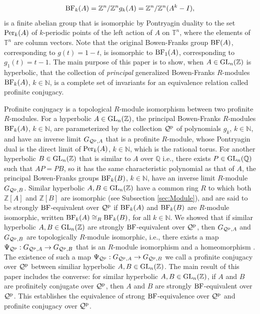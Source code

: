 \documentclass{amsart}
\theoremstyle{plain}
\theoremstyle{definition}
\theoremstyle{remark}
\begin{document}
\[ {\rm BF}_k(A) = {\mathbb Z}^n/{\mathbb Z}^n g_k(A) = {\mathbb Z}^n/{\mathbb Z}^n(A^k-I),\]
is a finite abelian group that is isomorphic by Pontryagin duality to the set ${\rm Per}_k(A)$ of $k$-periodic points of the left action of $A$ on ${\mathbb T}^n$, where the elements of ${\mathbb T}^n$ are column vectors. Note that the original Bowen-Franks group ${\rm BF}(A)$, corresponding to $g(t) = 1-t$, is isomorphic to ${\rm BF}_1(A)$, corresponding to $g_1(t) = t-1$. The main purpose of this paper is to show, when $A\in {\rm GL}_n({\mathbb Z})$ is hyperbolic, that the collection of {\it principal} generalized Bowen-Franks $R$-modules ${\rm BF}_k(A)$, $k \in {\mathbb N}$, is a complete set of invariants for an equivalence relation called profinite conjugacy.

Profinite conjugacy is a topological $R$-module isomorphism between two profinite $R$-modules. For a hyperbolic $A\in {\rm GL}_n({\mathbb Z})$, the principal Bowen-Franks $R$-modules ${\rm BF}_k(A)$, $k\in {\mathbb N}$, are parameterized by the collection ${\mathcal Q}^{\rm p}$ of polynomials $g_k$, $k\in {\mathbb N}$, and have an inverse limit $G_{ {\mathcal Q}^{\rm p},A}$ that is a profinite $R$-module, whose Pontryagin dual is the direct limit of ${\rm Per}_k(A)$, $k\in {\mathbb N}$, which is the rational torus. For another hyperbolic $B\in{\rm GL}_n({\mathbb Z})$ that is similar to $A$ over ${\mathbb Q}$ i.e., there exists $P\in {\rm GL}_n({\mathbb Q})$ such that $AP = PB$, so it has the same characteristic polynomial as that of $A$, the principal Bowen-Franks groups ${\rm BF}_k(B)$, $k\in {\mathbb N}$, have an inverse limit $R$-module $G_{ {\mathcal Q}^{\rm p},B}$. Similar hyperbolic $A,B\in {\rm GL}_n({\mathbb Z})$ have a common ring $R$ to which both ${\mathbb Z}[A]$ and ${\mathbb Z}[B]$ are isomorphic (see Subsection \ref{sec:Module}), and are said to be strongly ${\rm BF}$-equivalent over ${\mathcal Q}^{\rm p}$ if ${\rm BF}_k(A)$ and ${\rm BF}_k(B)$ are $R$-module isomorphic, written  ${\rm BF}_k(A) \cong_R {\rm BF}_k(B)$, for all $k\in {\mathbb N}$. We showed that if similar hyperbolic $A,B\in {\rm GL}_n({\mathbb Z})$ are strongly ${\rm BF}$-equivalent over ${\mathcal Q}^{\rm p}$, then $G_{ {\mathcal Q}^{\rm p},A}$ and $G_{ {\mathcal Q}^{\rm p},B}$ are topologically $R$-module isomorphic, i.e., there exists a map $\Psi_{ {\mathcal Q}^{\rm p}}:G_{ {\mathcal Q}^{\rm p},A} \to G_{ {\mathcal Q}^{\rm p},B}$ that is an $R$-module isomorphism and a homeomorphism \cite{BM12}. The existence of such a map $\Psi_{ {\mathcal Q}^{\rm p}}:G_{ {\mathcal Q}^{\rm p},A}\to G_{ {\mathcal Q}^{\rm p},B}$ we call a profinite conjugacy over ${\mathcal Q}^{\rm p}$ between similiar hyperbolic $A,B\in {\rm GL}_n({\mathbb Z})$. The main result of this paper includes the converse: for similar hyperbolic $A,B\in{\rm GL}_n({\mathbb Z})$, if $A$ and $B$ are profinitely conjugate over ${\mathcal Q}^{\rm p}$, then $A$ and $B$ are strongly ${\rm BF}$-equivalent over ${\mathcal Q}^{\rm p}$. This establishes the equivalence of strong ${\rm BF}$-equivalence over ${\mathcal Q}^{\rm p}$ and profinite conjugacy over ${\mathcal Q}^{\rm p}$. 
\end{document}
